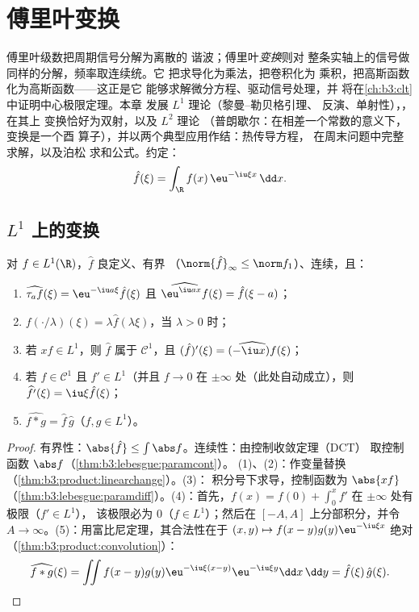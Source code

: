\chapter{傅里叶变换}\label{ch:b3:fouriertransform}

傅里叶级数把周期信号分解为离散的
谐波；傅里叶\emph{变换}则对
整条实轴上的信号做同样的分解，频率取连续统。它
把求导化为乘法，把卷积化为
乘积，把高斯函数化为高斯函数——这正是它
能够求解微分方程、驱动信号处理，并
将在\cref{ch:b3:clt}中证明中心极限定理。本章
发展 $L^1$ 理论（黎曼–勒贝格引理、
反演、单射性），，在其上
变换恰好为双射，以及 $L^2$ 理论
（普朗歇尔：在相差一个常数的意义下，变换是一个酉
算子），并以两个典型应用作结：热传导方程，
在周末问题中完整求解，以及泊松
求和公式。约定：
\[
\hat f(\xi) = \int_\R f(x)\,\eu^{-\iu\xi x}\,\dd x .
\]

\section{\texorpdfstring{$L^1$ 上的变换}{L1 上的变换}}

\begin{proposition}\label{prop:b3:fouriertransform:basic}
对 $f \in L^1(\R)$，$\hat f$ 良定义、有界
（$\norm{\hat f}_\infty \leq \norm f_1$）、连续，且：
\begin{enumerate}
  \item $\widehat{\tau_af}(\xi) = \eu^{-\iu a\xi}\hat f(\xi)$
        且 $\widehat{\eu^{\iu ax}f}(\xi) = \hat f(\xi - a)$；
  \item $\widehat{f(\cdot/\lambda)}(\xi) = \lambda\hat
        f(\lambda\xi)$，当 $\lambda > 0$ 时；
  \item 若 $xf \in L^1$，则 $\hat f$ 属于 $\mathcal C^1$，且
        $(\hat f)'(\xi) = \widehat{(-\iu x)f}(\xi)$；
  \item 若 $f \in \mathcal C^1$ 且 $f' \in L^1$（并且 $f \to
        0$ 在 $\pm\infty$ 处（此处自动成立），则
        $\widehat{f'}(\xi) = \iu\xi\hat f(\xi)$；
  \item $\widehat{f * g} = \hat f\,\hat g$（$f, g \in L^1$）。
\end{enumerate}
\end{proposition}

\begin{proof}
有界性：$\abs{\hat f} \leq \int\abs f$。连续性：由控制收敛定理（DCT）
取控制函数 $\abs f$（\cref{thm:b3:lebesgue:paramcont}）。
(1)、(2)：作变量替换
（\cref{thm:b3:product:linearchange}）。(3)：
积分号下求导，控制函数为 $\abs{xf}$
（\cref{thm:b3:lebesgue:paramdiff}）。(4)：首先，$f(x) = f(0)
+ \int_0^xf'$ 在 $\pm\infty$ 处有极限（$f' \in L^1$），
该极限必为 $0$（$f \in L^1$）；然后在 $[-A,
A]$ 上分部积分，并令 $A \to \infty$。(5)：用富比尼定理，其合法性在于
$(x,y)\mapsto f(x - y)g(y)\eu^{-\iu\xi x}$ 绝对
（\cref{thm:b3:product:convolution}）：
\[
\widehat{f*g}(\xi) = \iint f(x - y)g(y)\eu^{-\iu\xi(x - y)}
\eu^{-\iu\xi y}\dd x\,\dd y = \hat f(\xi)\,\hat g(\xi).
\]
\end{proof}

